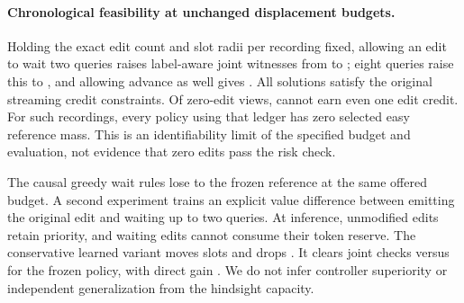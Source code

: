 \paragraph{Chronological feasibility at unchanged displacement budgets.}
Holding the exact edit count and slot radii per recording fixed, allowing
an edit to wait two queries raises label-aware joint witnesses from
\TimingFixed{} to \TimingShort{}; eight queries raise this to \TimingLong{},
and allowing advance as well gives \TimingBoth{}. All solutions satisfy the
original streaming credit constraints. Of \TimingEmpty{} zero-edit views,
\TimingQuota{} cannot earn even one edit credit. For such recordings,
every policy using that ledger has zero selected easy reference mass.
This is an identifiability limit of the specified budget and evaluation,
not evidence that zero edits pass the risk check.

The causal greedy wait rules lose to the frozen reference at the same
offered budget. A second experiment trains an explicit value difference
between emitting the original edit and waiting up to two queries.
At inference, unmodified edits retain priority, and waiting edits cannot
consume their token reserve. The conservative learned variant moves
\TimingMoved{} slots and drops \TimingDropped{}. It clears \TimingLearned{}
joint checks versus \TimingAnchor{} for the frozen policy, with direct
gain \TimingGain{}. We do not infer controller superiority or independent
generalization from the hindsight capacity.
